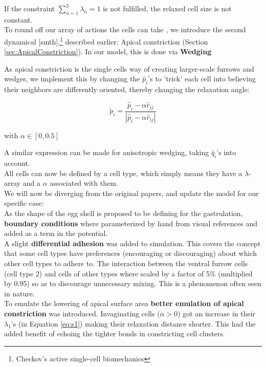If the constraint $\sum_{n=1}^{3}\lambda_n=1$ is not fulfilled, the relaxed cell size is not constant. \\

To round off our array of actions the cells can take \reph, we introduce the second dynamical [smth],\footnote{Checkov's active single-cell biomechanics} described earlier: Apical constriction (Section \ref{sec:ApicalConstriction}). In our model, this is done via \textbf{Wedging}

As apical constriction is the single cells way of creating larger-scale furrows and wedges, we implement this by changing the $\hat{p}_i$'s to 'trick' each cell into believing their neighbors are differently oriented, thereby changing the relaxation angle:

\begin{equation}
    \tilde{{p}}_i = \frac{\hat{p}_i-\alpha \widehat{{r}}_{i j}}{|\hat{p}_i-\alpha \widehat{{r}}_{i j}|} 
\end{equation}

with $\alpha\in [0,0.5]$ 



A similar expression can be made for anisotropic wedging, taking  $\hat{q}_i$'s into account.\\
All cells can now be defined by a cell type, which simply means they have a $\lambda$-array and a $\alpha$ associated with them. \\


We will now be diverging from the original papers, and update the model for our specific case:\\

As the shape of the egg shell is proposed to be defining for the gastrulation, \textbf{boundary conditions} where parameterized by hand from visual references and added as a term in the potential.\\

A slight \textbf{differential adhesion} was added to simulation. This covers the concept that some cell types have preferences (encouraging or discouraging) about which other cell types to adhere to.
The interaction between the ventral furrow cells (cell type 2) and cells of other types where scaled by a factor of 5\% (multiplied by 0.95) so as to discourage unnecessary mixing. This is a phenomenon often seen in nature.\\

To emulate the lowering of apical surface area \textbf{better emulation of apical constriction} was introduced. Invaginating cells ($\alpha > 0$) got an increase in their $\lambda_1$'s (in Equation \ref{eq:s1}) making their relaxation distance shorter. This had the added benefit of echoing the tighter bonds in constricting cell clusters.\\

